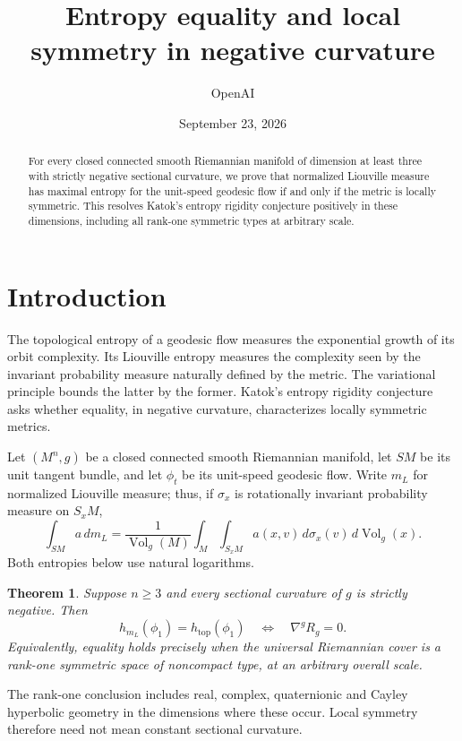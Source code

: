 \documentclass[11pt,a4paper]{article}
\title{Entropy equality and local symmetry in negative curvature}
\author{OpenAI}
\date{September 23, 2026}
\newtheorem{theorem}{Theorem}[section]
\theoremstyle{definition}
\theoremstyle{remark}
\DeclareMathOperator{\Vol}{Vol}
\newcommand{\htop}{h_{\mathrm{top}}}
\numberwithin{equation}{section}
\begin{document}
\maketitle
\begin{abstract}
For every closed connected smooth Riemannian manifold of dimension at
least three with strictly negative sectional curvature, we prove that
normalized Liouville measure has maximal entropy for the unit-speed
geodesic flow if and only if the metric is locally symmetric. This
resolves Katok's entropy rigidity conjecture positively in these
dimensions, including all rank-one symmetric types at arbitrary scale.
\end{abstract}

\section{Introduction}
\label{sec:introduction}

The topological entropy of a geodesic flow measures the exponential
growth of its orbit complexity. Its Liouville entropy measures the
complexity seen by the invariant probability measure naturally
defined by the metric. The variational principle bounds the latter by
the former. Katok's entropy rigidity conjecture asks whether equality,
in negative curvature, characterizes locally symmetric metrics.

Let $(M^n,g)$ be a closed connected smooth Riemannian manifold, let
$SM$ be its unit tangent bundle, and let $\phi_t$ be its unit-speed
geodesic flow. Write $m_L$ for normalized Liouville measure; thus, if
$\sigma_x$ is rotationally invariant probability measure on $S_xM$,
\[
 \int_{SM} a\,dm_L
 =\frac{1}{\Vol_g(M)}\int_M\int_{S_xM}a(x,v)\,d\sigma_x(v)\,d\Vol_g(x).
\]
Both entropies below use natural logarithms.

\begin{theorem}\label{thm:main}
Suppose $n\ge3$ and every sectional curvature of $g$ is strictly
negative. Then
\[
 h_{m_L}(\phi_1)=\htop(\phi_1)
 \quad\Longleftrightarrow\quad
 \nabla^gR_g=0.
\]
Equivalently, equality holds precisely when the universal Riemannian
cover is a rank-one symmetric space of noncompact type, at an arbitrary
overall scale.
\end{theorem}

The rank-one conclusion includes real, complex, quaternionic and Cayley
hyperbolic geometry in the dimensions where these occur. Local symmetry
therefore need not mean constant sectional curvature.
\end{document}
